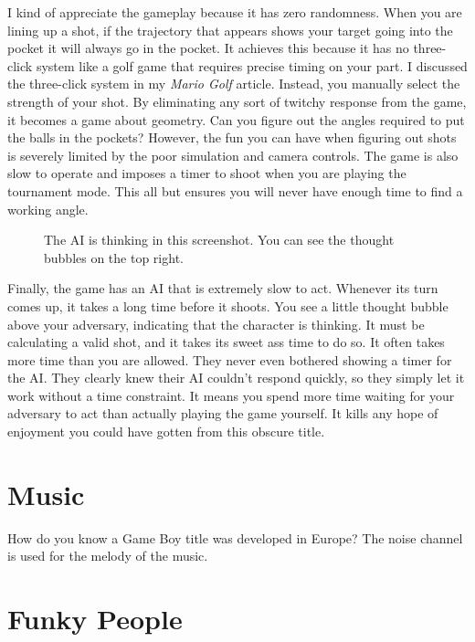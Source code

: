 \documentclass{book}
\begin{document}
I kind of appreciate the gameplay because it has zero randomness. When you are lining up a shot, if the trajectory that appears shows your target going into the pocket it will always go in the pocket. It achieves this because it has no three-click system like a golf game that requires precise timing on your part. I discussed the three-click system in my \emph{Mario Golf} article. Instead, you manually select the strength of your shot. By eliminating any sort of twitchy response from the game, it becomes a game about geometry. Can you figure out the angles required to put the balls in the pockets? However, the fun you can have when figuring out shots is severely limited by the poor simulation and camera controls. The game is also slow to operate and imposes a timer to shoot when you are playing the tournament mode. This all but ensures you will never have enough time to find a working angle.\par
\FloatBarrier\vspace{\baselineskip}\begin{figure}[H]\caption*{The AI is thinking in this screenshot. You can see the thought bubbles on the top right.}\end{figure}
Finally, the game has an AI that is extremely slow to act. Whenever its turn comes up, it takes a long time before it shoots. You see a little thought bubble above your adversary, indicating that the character is thinking. It must be calculating a valid shot, and it takes its sweet ass time to do so. It often takes more time than you are allowed. They never even bothered showing a timer for the AI. They clearly knew their AI couldn’t respond quickly, so they simply let it work without a time constraint. It means you spend more time waiting for your adversary to act than actually playing the game yourself. It kills any hope of enjoyment you could have gotten from this obscure title.\par
\FloatBarrier\section*{Music}
How do you know a Game Boy title was developed in Europe? The noise channel is used for the melody of the music.\par
\FloatBarrier\section*{Funky People}
\FloatBarrier\vspace{\baselineskip}\begin{figure}[H]\end{figure}
\end{document}
